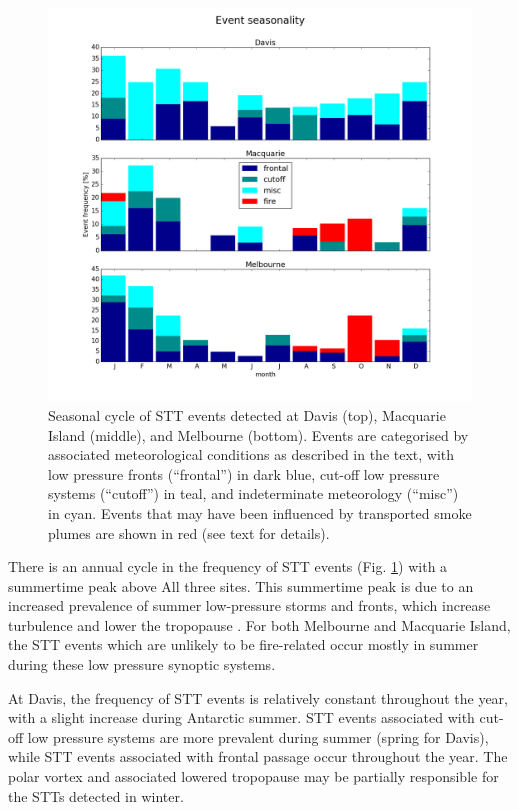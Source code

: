 \documentclass{article}
\begin{document}
  \begin{figure}[!htbp]
    \begin{center}
    \includegraphics[width=1.0\columnwidth]{figures/summary_season.png}
    \caption{Seasonal cycle of STT events detected at Davis (top), Macquarie Island (middle), and Melbourne (bottom).
      Events are categorised by associated meteorological conditions as described in the text, with low pressure fronts (“frontal”) in dark blue, cut-off low pressure systems (“cutoff”) in teal, and indeterminate meteorology (“misc”) in cyan. 
      Events that may have been influenced by transported smoke plumes are shown in red (see text for details).}
    \label{fig:SummarySeasonality}
    \end{center}
  \end{figure}
  
  There is an annual cycle in the frequency of STT events  (Fig. \ref{fig:SummarySeasonality}) with a summertime peak above All three sites.
  This summertime peak is due to an increased prevalence of summer low-pressure storms and fronts, which increase turbulence and lower the tropopause \citep{Reutter2015}.
  For both Melbourne and Macquarie Island, the STT events which are unlikely to be fire-related occur mostly in summer during these low pressure synoptic systems.
  
  At Davis, the frequency of STT events is relatively constant throughout the year, with a slight increase during Antarctic summer.
  STT events associated with cut-off low pressure systems are more prevalent during summer (spring for Davis), while STT events associated with frontal passage occur throughout the year.
  The polar vortex and associated lowered tropopause may be partially responsible for the STTs detected in winter.
\end{document}
